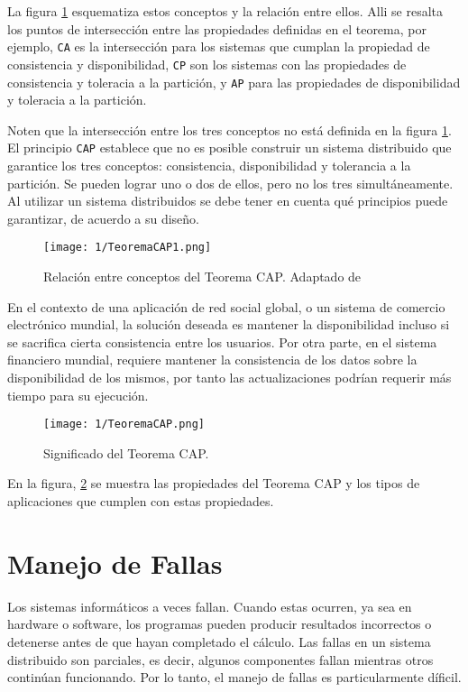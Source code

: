 La figura \ref{fig:marginTeoremaCAP} esquematiza estos conceptos y la relaci\'on entre ellos. Alli se resalta los puntos de intersecci\'on entre las propiedades definidas en el teorema, por ejemplo, \texttt{CA} es la intersecci\'on para los sistemas que cumplan la propiedad de consistencia y disponibilidad, \texttt{CP} son los sistemas con las propiedades de consistencia y toleracia a la partici\'on, y \texttt{AP} para las propiedades de disponibilidad y toleracia a la partici\'on.

Noten que la intersecci\'on entre los tres conceptos  no est\'a definida en la figura \ref{fig:marginTeoremaCAP}. El principio \texttt{CAP} establece que no es posible construir un sistema distribuido que garantice los tres conceptos: consistencia, disponibilidad y tolerancia a la partici\'on. Se pueden lograr uno o dos de ellos, pero no los tres simultáneamente. Al utilizar un sistema distribuidos se debe tener en cuenta qu\'e principios puede garantizar, de acuerdo a su dise\~no. 

\begin{figure}%
	\texttt{[image: 1/TeoremaCAP1.png]}
	\caption{ Relaci\'on entre conceptos del Teorema CAP. Adaptado  de \DE }
	\label{fig:marginTeoremaCAP}
\end{figure}


En el contexto de una aplicaci\'on de red social global, o un sistema de comercio electr\'onico mundial, la solución deseada es mantener la disponibilidad incluso si se sacrifica cierta consistencia entre los usuarios. Por otra parte, en el sistema financiero mundial, requiere  mantener la consistencia de los datos sobre la disponibilidad de los mismos, por tanto las actualizaciones podr\'ian requerir m\'as tiempo para su ejecuci\'on. 
\begin{figure}
	\texttt{[image: 1/TeoremaCAP.png]}
	\caption {Significado del Teorema CAP.}
	\label{fig:TeoremaCAP}
\end{figure}

En la figura,  \ref{fig:TeoremaCAP} se muestra las propiedades del Teorema CAP y los tipos de aplicaciones que cumplen con estas propiedades.

	\section{Manejo de Fallas}  
Los sistemas informáticos a veces fallan. Cuando estas ocurren, ya sea en  hardware o software, los programas pueden producir resultados incorrectos o  detenerse antes de que hayan completado el cálculo.  Las fallas en un sistema distribuido son parciales, es decir, algunos componentes fallan mientras otros continúan funcionando. Por lo tanto, el manejo de fallas es particularmente díficil. 


